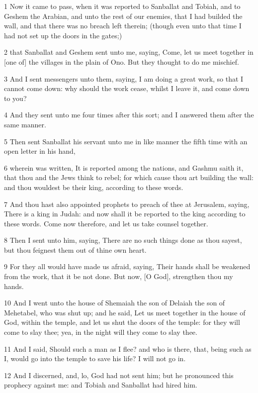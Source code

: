 \par 1 Now it came to pass, when it was reported to Sanballat and Tobiah, and to Geshem the Arabian, and unto the rest of our enemies, that I had builded the wall, and that there was no breach left therein; (though even unto that time I had not set up the doors in the gates;)
\par 2 that Sanballat and Geshem sent unto me, saying, Come, let us meet together in [one of] the villages in the plain of Ono. But they thought to do me mischief.
\par 3 And I sent messengers unto them, saying, I am doing a great work, so that I cannot come down: why should the work cease, whilst I leave it, and come down to you?
\par 4 And they sent unto me four times after this sort; and I answered them after the same manner.
\par 5 Then sent Sanballat his servant unto me in like manner the fifth time with an open letter in his hand,
\par 6 wherein was written, It is reported among the nations, and Gashmu saith it, that thou and the Jews think to rebel; for which cause thou art building the wall: and thou wouldest be their king, according to these words.
\par 7 And thou hast also appointed prophets to preach of thee at Jerusalem, saying, There is a king in Judah: and now shall it be reported to the king according to these words. Come now therefore, and let us take counsel together.
\par 8 Then I sent unto him, saying, There are no such things done as thou sayest, but thou feignest them out of thine own heart.
\par 9 For they all would have made us afraid, saying, Their hands shall be weakened from the work, that it be not done. But now, [O God], strengthen thou my hands.
\par 10 And I went unto the house of Shemaiah the son of Delaiah the son of Mehetabel, who was shut up; and he said, Let us meet together in the house of God, within the temple, and let us shut the doors of the temple: for they will come to slay thee; yea, in the night will they come to slay thee.
\par 11 And I said, Should such a man as I flee? and who is there, that, being such as I, would go into the temple to save his life? I will not go in.
\par 12 And I discerned, and, lo, God had not sent him; but he pronounced this prophecy against me: and Tobiah and Sanballat had hired him.
